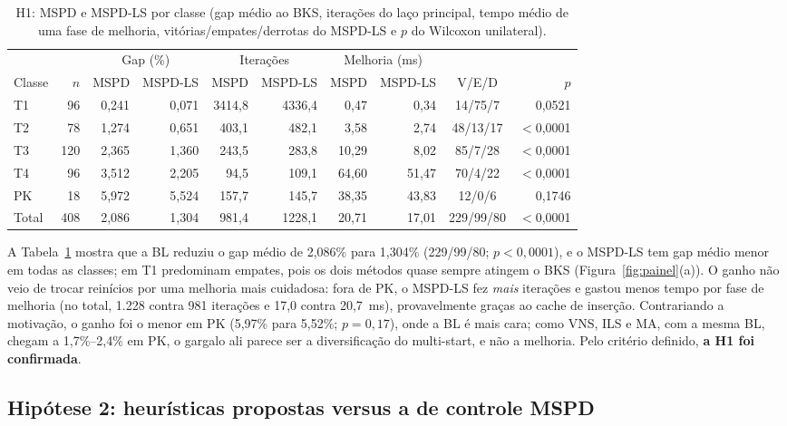 \begin{table}[t]
\centering
\caption{H1: MSPD e MSPD-LS por classe (gap médio ao BKS, iterações do laço principal, tempo médio de uma fase de melhoria, vitórias/empates/derrotas do MSPD-LS e $p$ do Wilcoxon unilateral).}
\label{tab:h1}
\footnotesize
\setlength{\tabcolsep}{4pt}
\begin{tabular}{lrrrrrrrcr}
\toprule
 & & \multicolumn{2}{c}{Gap (\%)} & \multicolumn{2}{c}{Iterações} & \multicolumn{2}{c}{Melhoria (ms)} & & \\
\cmidrule(lr){3-4}\cmidrule(lr){5-6}\cmidrule(lr){7-8}
Classe & $n$ & MSPD & MSPD-LS & MSPD & MSPD-LS & MSPD & MSPD-LS & V/E/D & $p$ \\
\midrule
T1 & 96 & 0,241 & 0,071 & 3414,8 & 4336,4 & 0,47 & 0,34 & 14/75/7 & 0,0521 \\
T2 & 78 & 1,274 & 0,651 & 403,1 & 482,1 & 3,58 & 2,74 & 48/13/17 & $<$0,0001 \\
T3 & 120 & 2,365 & 1,360 & 243,5 & 283,8 & 10,29 & 8,02 & 85/7/28 & $<$0,0001 \\
T4 & 96 & 3,512 & 2,205 & 94,5 & 109,1 & 64,60 & 51,47 & 70/4/22 & $<$0,0001 \\
PK & 18 & 5,972 & 5,524 & 157,7 & 145,7 & 38,35 & 43,83 & 12/0/6 & 0,1746 \\
\midrule
Total & 408 & 2,086 & 1,304 & 981,4 & 1228,1 & 20,71 & 17,01 & 229/99/80 & $<$0,0001 \\
\bottomrule
\end{tabular}
\end{table}

A Tabela~\ref{tab:h1} mostra que a BL reduziu o gap médio de 2,086\% para 1,304\% (229/99/80; $p<0{,}0001$), e o MSPD-LS tem gap médio menor em todas as classes; em T1 predominam empates, pois os dois métodos quase sempre atingem o BKS (Figura~\ref{fig:painel}(a)). O ganho não veio de trocar reinícios por uma melhoria mais cuidadosa: fora de PK, o MSPD-LS fez \emph{mais} iterações e gastou menos tempo por fase de melhoria (no total, 1.228 contra 981 iterações e 17,0 contra 20,7~ms), provavelmente graças ao cache de inserção. Contrariando a motivação, o ganho foi o menor em PK (5,97\% para 5,52\%; $p=0{,}17$), onde a BL é mais cara; como VNS, ILS e MA, com a mesma BL, chegam a 1,7\%--2,4\% em PK, o gargalo ali parece ser a diversificação do multi-start, e não a melhoria. Pelo critério definido, \textbf{a H1 foi confirmada}.

\subsection{Hipótese 2: heurísticas propostas versus a de controle MSPD}

